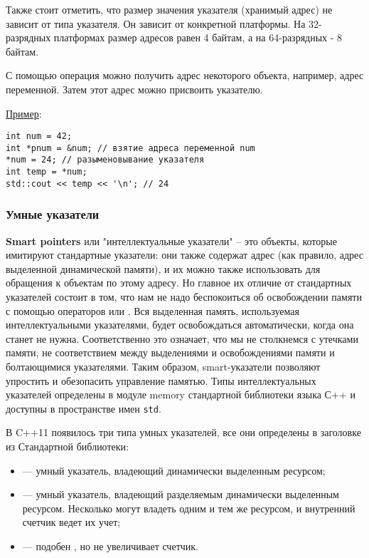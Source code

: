 Также стоит отметить, что размер значения указателя (хранимый адрес) не зависит от типа указателя. Он зависит от конкретной платформы. На 32-разрядных платформах размер адресов равен 4 байтам, а на 64-разрядных - 8 байтам.

С помощью операция \mverb{&} можно получить адрес некоторого объекта, например, адрес переменной. Затем этот адрес можно присвоить указателю.

\vspace{\baselineskip}

\noindent\underline{Пример}:
\begin{verbatim}
int num = 42;
int *pnum = &num; // взятие адреса переменной num
*num = 24; // разыменовывание указателя 
int temp = *num;
std::cout << temp << '\n'; // 24
\end{verbatim}

\subsubsection{Умные указатели}

\textbf{Smart pointers} или "интеллектуальные указатели" -- это объекты, которые имитируют стандартные указатели: они также содержат адрес (как правило, адрес выделенной динамической памяти), и их можно также использовать для обращения к объектам по этому адресу. Но главное их отличие от стандартных указателей состоит в том, что нам не надо беспокоиться об освобождении памяти с помощью операторов  или . Вся выделенная память, используемая интеллектуальными указателями, будет освобождаться автоматически, когда она станет не нужна. Соответственно это означает, что мы не столкнемся с утечками памяти, не соответствием между выделениями и освобождениями памяти и болтающимися указателями. Таким образом, smart-указатели позволяют упростить и обезопасить управление памятью. Типы интеллектуальных указателей определены в модуле memory стандартной библиотеки языка С++ и доступны в пространстве имен \texttt{std}.

В C++11 появилось три типа умных указателей, все они определены в заголовке из Стандартной библиотеки:
\begin{itemize}
    \item {} — умный указатель, владеющий динамически выделенным ресурсом;
    \item {} — умный указатель, владеющий разделяемым динамически выделенным ресурсом. Несколько  могут владеть одним и тем же ресурсом, и внутренний счетчик ведет их учет;
    \item {} — подобен , но не увеличивает счетчик.
\end{itemize}

